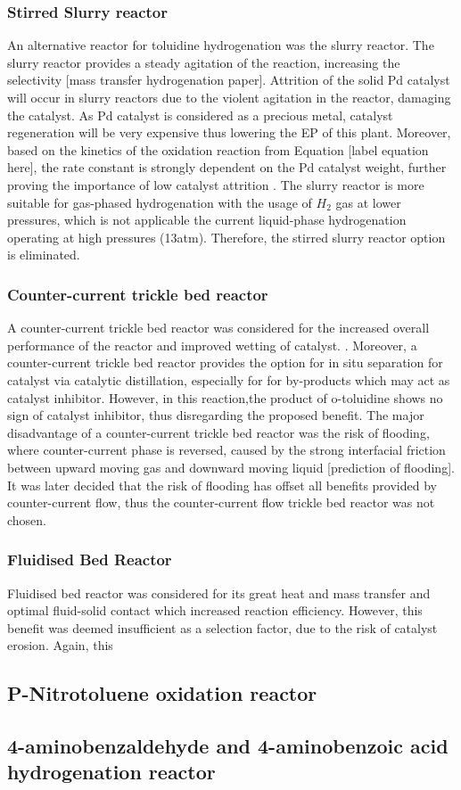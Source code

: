 \subsubsection{Stirred Slurry reactor}
An alternative reactor for toluidine hydrogenation was the slurry reactor. The slurry reactor provides a steady agitation of the reaction, increasing the selectivity [mass transfer hydrogenation paper]. Attrition of the solid Pd catalyst will occur in slurry reactors due to the violent agitation in the reactor, damaging the catalyst. As Pd catalyst is considered as a precious metal, catalyst regeneration will be very expensive thus lowering the EP of this plant. Moreover, based on the kinetics of the oxidation reaction from Equation [label equation here], the rate constant is strongly dependent on the Pd catalyst weight, further proving the importance of low catalyst attrition \cite{rajadhyaksha_solvent_1986}.
The slurry reactor is more suitable for gas-phased hydrogenation with the usage of $H_2$ gas at lower pressures, which is not applicable the current liquid-phase hydrogenation operating at high pressures (13atm). Therefore, the stirred slurry reactor option is eliminated. \cite{ranade_chapter_2011}

\subsubsection{Counter-current trickle bed reactor}
A counter-current trickle bed reactor was considered for the increased overall performance of the reactor and improved wetting of catalyst. \cite{kundu_novel_2003}. Moreover, a counter-current trickle bed reactor provides the option for in situ separation for catalyst via catalytic distillation, especially for for by-products which may act as catalyst inhibitor. However, in this reaction,the product of o-toluidine shows no sign of catalyst inhibitor, thus disregarding the proposed benefit. The major disadvantage of a counter-current trickle bed reactor was the risk of flooding, where counter-current phase is reversed, caused by the strong interfacial friction between upward moving gas and downward moving liquid [prediction of flooding]. It was later decided that the risk of flooding has offset all benefits provided by counter-current flow, thus the counter-current flow trickle bed reactor was not chosen. 

\subsubsection{Fluidised Bed Reactor}
Fluidised bed reactor was considered for its great heat and mass transfer and optimal fluid-solid contact which increased reaction efficiency. However, this benefit was deemed insufficient as a selection factor, due to the risk of catalyst erosion. Again, this 
\subsection{P-Nitrotoluene oxidation reactor}

\subsection{4-aminobenzaldehyde and 4-aminobenzoic acid hydrogenation reactor}


